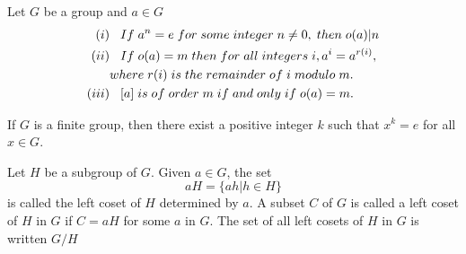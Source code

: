 \begin{teo}
Let $G$ be a group and $a\in G$
\begin{align*}
    (i)&\hspace{.3cm}If\hspace{.1cm}a^n=e\hspace{.1cm}for\hspace{.1cm}some\hspace{.1cm}integer\hspace{.1cm}n\neq 0,\hspace{.1cm}then\hspace{.1cm}o(a)|n\\
    (ii)&\hspace{.3cm}If\hspace{.1cm}o(a)=m\hspace{.1cm}then\hspace{.1cm}for\hspace{.1cm}all\hspace{.1cm}integers\hspace{.1cm}i,a^i=a^{r(i)},\\
    \hspace{.1cm}&where\hspace{.1cm} r(i)\hspace{.1cm}is\hspace{.1cm}the\hspace{.1cm}remainder\hspace{.1cm}of\hspace{.1cm}i\hspace{.1cm}modulo\hspace{.1cm}m.\\
    (iii)&\hspace{.3cm}[a]\hspace{.1cm}is\hspace{.1cm}of\hspace{.1cm}order\hspace{.1cm}m\hspace{.1cm}if\hspace{.1cm}and\hspace{.1cm}only\hspace{.1cm}if\hspace{.1cm}o(a)=m.
\end{align*}
\end{teo}
\begin{coro}
If $G$ is a finite group, then there exist a positive integer $k$ such that $x^k=e$ for all $x\in G$.
\end{coro}
\begin{defi}
    Let $H$ be a subgroup of $G$. Given $a\in G$, the set
    \begin{equation*}
        aH=\{ah|h\in H\}
    \end{equation*}
    is called the left coset of $H$ determined by $a$. A subset $C$ of $G$ is called a left coset of $H$ in $G$ if $C=aH$ for some $a$ in $G$. The set of all left cosets of $H$ in $G$ is written $G/H$
\end{defi}

